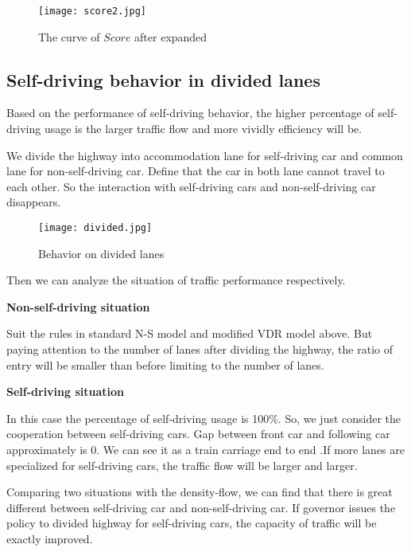 \documentclass{mcmthesis}
\numberwithin{equation}{section}
\begin{document}
			\begin{figure}[H]
				\begin{center}
					\texttt{[image: score2.jpg]}
					\caption{The curve of $Score$ after expanded}
				\end{center}
			\end{figure}

		\subsection{Self-driving behavior in divided lanes}
			Based on the performance of self-driving behavior, the higher percentage of self-driving usage is the larger traffic flow and more vividly efficiency will be.

			We divide the highway into accommodation lane for self-driving car and common lane for non-self-driving car. Define that the car in both lane cannot travel to each other. So the interaction with self-driving cars and non-self-driving car disappears. 
			\begin{figure}[H]
				\begin{center}
					\texttt{[image: divided.jpg]}
					\caption{Behavior on divided lanes}
				\end{center}
			\end{figure}

			Then we can analyze the situation of traffic performance respectively.

			\noindent \textbf{Non-self-driving situation}

			Suit the rules in standard N-S model and modified VDR model above. But paying attention to the number of lanes after dividing the highway, the ratio of entry will be smaller than before limiting to the number of lanes.

			\noindent \textbf{Self-driving situation}

			In this case the percentage of self-driving usage is 100\%. So, we just consider the cooperation between self-driving cars. Gap between front car and following car approximately is 0. We can see it as a train carriage end to end .If more lanes are specialized for self-driving cars, the traffic flow will be larger and larger.

			Comparing two situations with the density-flow, we can find that there is great different between self-driving car and non-self-driving car. If governor issues the policy to divided highway for self-driving cars, the capacity of traffic will be exactly improved.   
\end{document}
